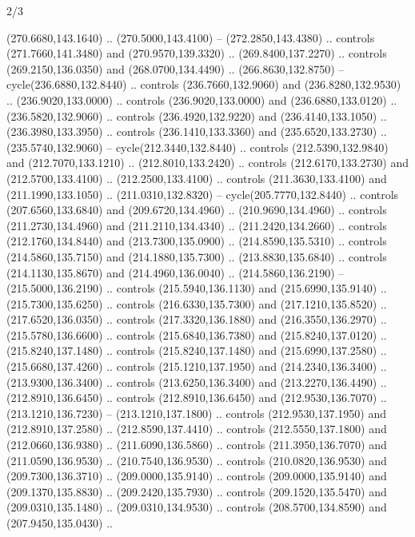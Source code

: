 \begin{flagdescription}{2/3}
\begin{scope}[xshift=0.5\flaglength,yshift=0.5\flagwidth,scale=\flagwidth/259.2]
\begin{scope}[y=0.8pt, x=0.8pt, yscale=-1,shift={(-243,-162)}]
      (270.6680,143.1640) .. (270.5000,143.4100) -- (272.2850,143.4380) .. controls
      (271.7660,141.3480) and (270.9570,139.3320) .. (269.8400,137.2270) .. controls
      (269.2150,136.0350) and (268.0700,134.4490) .. (266.8630,132.8750) --
      cycle(236.6880,132.8440) .. controls (236.7660,132.9060) and
      (236.8280,132.9530) .. (236.9020,133.0000) .. controls (236.9020,133.0000) and
      (236.6880,133.0120) .. (236.5820,132.9060) .. controls (236.4920,132.9220) and
      (236.4140,133.1050) .. (236.3980,133.3950) .. controls (236.1410,133.3360) and
      (235.6520,133.2730) .. (235.5740,132.9060) -- cycle(212.3440,132.8440) ..
      controls (212.5390,132.9840) and (212.7070,133.1210) .. (212.8010,133.2420) ..
      controls (212.6170,133.2730) and (212.5700,133.4100) .. (212.2500,133.4100) ..
      controls (211.3630,133.4100) and (211.1990,133.1050) .. (211.0310,132.8320) --
      cycle(205.7770,132.8440) .. controls (207.6560,133.6840) and
      (209.6720,134.4960) .. (210.9690,134.4960) .. controls (211.2730,134.4960) and
      (211.2110,134.4340) .. (211.2420,134.2660) .. controls (212.1760,134.8440) and
      (213.7300,135.0900) .. (214.8590,135.5310) .. controls (214.5860,135.7150) and
      (214.1880,135.7300) .. (213.8830,135.6840) .. controls (214.1130,135.8670) and
      (214.4960,136.0040) .. (214.5860,136.2190) -- (215.5000,136.2190) .. controls
      (215.5940,136.1130) and (215.6990,135.9140) .. (215.7300,135.6250) .. controls
      (216.6330,135.7300) and (217.1210,135.8520) .. (217.6520,136.0350) .. controls
      (217.3320,136.1880) and (216.3550,136.2970) .. (215.5780,136.6600) .. controls
      (215.6840,136.7380) and (215.8240,137.0120) .. (215.8240,137.1480) .. controls
      (215.8240,137.1480) and (215.6990,137.2580) .. (215.6680,137.4260) .. controls
      (215.1210,137.1950) and (214.2340,136.3400) .. (213.9300,136.3400) .. controls
      (213.6250,136.3400) and (213.2270,136.4490) .. (212.8910,136.6450) .. controls
      (212.8910,136.6450) and (212.9530,136.7070) .. (213.1210,136.7230) --
      (213.1210,137.1800) .. controls (212.9530,137.1950) and (212.8910,137.2580) ..
      (212.8590,137.4410) .. controls (212.5550,137.1800) and (212.0660,136.9380) ..
      (211.6090,136.5860) .. controls (211.3950,136.7070) and (211.0590,136.9530) ..
      (210.7540,136.9530) .. controls (210.0820,136.9530) and (209.7300,136.3710) ..
      (209.0000,135.9140) .. controls (209.0000,135.9140) and (209.1370,135.8830) ..
      (209.2420,135.7930) .. controls (209.1520,135.5470) and (209.0310,135.1480) ..
      (209.0310,134.9530) .. controls (208.5700,134.8590) and (207.9450,135.0430) ..

\end{scope}
\end{scope}
\end{flagdescription}
